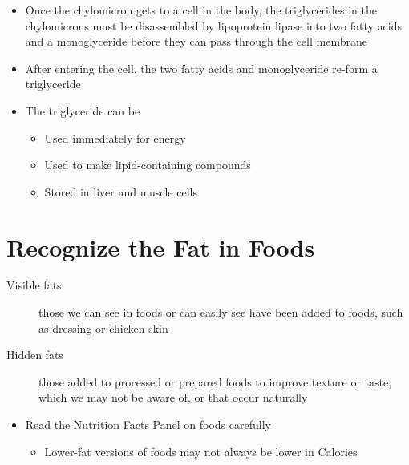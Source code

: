 \documentclass[title={Chapter 5}]{fdsn201notes}
\begin{document}
\begin{itemize}
	\item Once the chylomicron gets to a cell in the body, the triglycerides in the chylomicrons must be disassembled by lipoprotein lipase into two fatty acids and a monoglyceride before they can pass through the cell membrane
	\item After entering the cell, the two fatty acids and monoglyceride re-form a triglyceride
	\item The triglyceride can be
	\begin{itemize}
		\item Used immediately for energy
		\item Used to make lipid-containing compounds
		\item Stored in liver and muscle cells
	\end{itemize}
\end{itemize}

\section{Recognize the Fat in Foods}\label{sec:recognize-the-fat-in-foods}
\begin{description}
	\item[Visible fats] those we can see in foods or can easily see have been added to foods, such as dressing or chicken skin
	\item[Hidden fats] those added to processed or prepared foods to improve texture or taste, which we may not be aware of, or that occur naturally
\end{description}
\begin{itemize}
	\item Read the Nutrition Facts Panel on foods carefully
	\begin{itemize}
		\item Lower-fat versions of foods may not always be lower in Calories
	\end{itemize}
\end{itemize}
\end{document}
